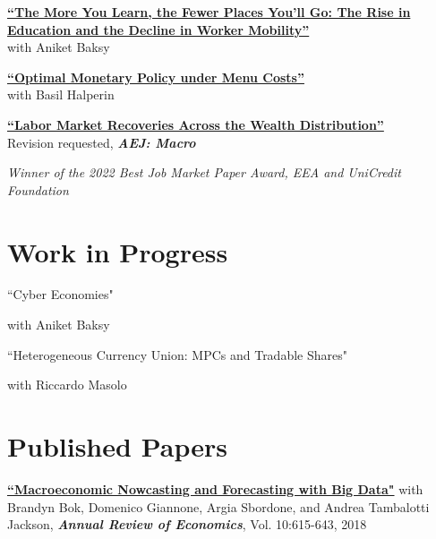 \documentclass[margin,line]{res}                          %
\newenvironment{list1}{
	\begin{list}{\ding{113}}{%
			\setlength{\itemsep}{0in}
			\setlength{\parsep}{0in} \setlength{\parskip}{0in}
			\setlength{\topsep}{0in} \setlength{\partopsep}{0in}
			\setlength{\leftmargin}{0.17in}}}{\end{list}}
\begin{document}
\begin{resume}
\begin{list1}
		\vspace{7pt}
		
		\item[] \href{https://danicaratelli.github.io/research/papers/The_Long_term_Decline_of_the_US_Job_Ladder.pdf}{\textbf{{\color{darkblue}``The More You Learn, the Fewer Places You’ll Go: The Rise in Education and the Decline in Worker Mobility''}}}\\ 
		with Aniket Baksy\smallskip
		
		\vspace{7pt}
		
		\item[] \href{https://danicaratelli.github.io/research/papers/OptimalMP_CaratelliHalperin.pdf}{\textbf{``Optimal Monetary Policy under Menu Costs''}}\\ with Basil Halperin\smallskip
		
		\vspace{7pt}
		
		\item[] \href{https://danicaratelli.github.io/research/papers/JMP_Caratelli.pdf}{\textbf{{\color{darkblue}``Labor Market Recoveries Across the Wealth Distribution''}}}\\
		Revision requested, \textit{\textbf{AEJ: Macro}}
		\item[] \emph{\textit{Winner of the 2022 Best Job Market Paper Award, EEA and UniCredit Foundation}}\smallskip
		
	\end{list1}
	
	\section{\sc Work in Progress}
	\begin{list1}
		\item[] ``Cyber Economies"		
		\item[] with Aniket Baksy \smallskip
		\vspace{7pt}
		\item[] ``Heterogeneous Currency Union: MPCs and Tradable Shares"		
		\item[] with Riccardo Masolo \smallskip
	\end{list1}
	
	\section{\sc Published Papers}
	\begin{list1}
		\item[] \href{https://www.annualreviews.org/doi/abs/10.1146/annurev-economics-083120-111540}{\textbf{``Macroeconomic Nowcasting and Forecasting with Big Data"}} with  Brandyn Bok, Domenico Giannone, Argia Sbordone, and Andrea Tambalotti  Jackson, \textit{\textbf{Annual Review of Economics}}, Vol. 10:615-643, 2018 \smallskip
	\end{list1}
	

\end{resume}
\end{document}
